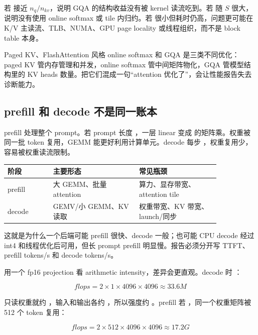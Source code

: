 若  接近 \(n_q/n_{kv}\)，说明 GQA 的结构收益没有被 kernel 读流吃到。若  随 \(S\) 很大，说明没有使用 online softmax 或 tile 内归约。若  很小但耗时仍高，问题更可能在 K/V 主读流、TLB、NUMA、GPU page locality 或线程组织，而不是 block table 本身。

\begin{warningbox}
Paged KV、FlashAttention 风格 online softmax 和 GQA 是三类不同优化：paged KV 管内存管理和并发，online softmax 管中间矩阵物化，GQA 管模型结构里的 KV heads 数量。把它们混成一句“attention 优化了”，会让性能报告失去诊断能力。
\end{warningbox}

\subsection{prefill 和 decode 不是同一账本}

prefill 处理整个 prompt。若 prompt 长度 ，一层 linear 变成  的矩阵乘。权重被同一批 token 复用，GEMM 能更好利用计算单元。decode 每步 ，权重复用少，容易被权重读流限制。

\begin{center}
\begin{tabular}{p{0.18\linewidth}p{0.34\linewidth}p{0.32\linewidth}}
\toprule
阶段 & 主要形态 & 常见瓶颈 \\
\midrule
prefill & 大 GEMM、批量 attention & 算力、显存带宽、attention tile \\
decode & GEMV/小 GEMM、KV 读取 & 权重带宽、KV 带宽、launch/同步 \\
\bottomrule
\end{tabular}
\end{center}

这就是为什么一个后端可能 prefill 很快、decode 一般；也可能 CPU decode 经过 int4 和线程优化后可用，但长 prompt prefill 明显慢。报告必须分开写 TTFT、prefill tokens/s 和 decode tokens/s。

用一个  fp16 projection 看 arithmetic intensity，差异会更直观。decode 时 ：

\[
flops = 2 \times 1 \times 4096 \times 4096 \approx 33.6M
\]

只读权重就约 ，输入和输出各约 ，所以强度约 。prefill 若 ，同一个权重矩阵被 512 个 token 复用：

\[
flops = 2 \times 512 \times 4096 \times 4096 \approx 17.2G
\]

